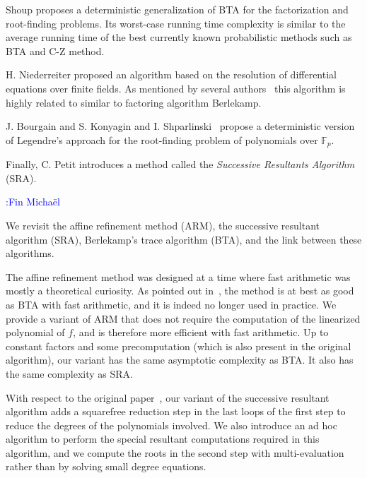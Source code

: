 \documentclass{sig-alternate}
\newcounter{algo}
\newcommand{\comf}{\noindent \textcolor{blue}{:Fin Micha\"el}}
\renewcommand{\paragraph}[1]{\smallskip\noindent{{\bf \rm #1.}}}
\begin{document}
Shoup\cite{Shoup91b} proposes a deterministic generalization of BTA for the factorization and root-finding problems. Its worst-case running time complexity is similar to the average running time of the best currently known probabilistic methods such as BTA and C-Z method.

H. Niederreiter\cite{nied94} proposed an algorithm based on the resolution of differential equations over finite fields.  As mentioned by several authors~\cite{Fleis96} this algorithm is highly related to similar to factoring algorithm Berlekamp.

J. Bourgain  and S. Konyagin and I. Shparlinski~\cite{BKS13} propose a deterministic version of Legendre's approach for the root-finding problem of polynomials over $\mathbb{F}_p$. 

Finally, C. Petit\cite{cgUCL-P14} introduces a method called the \emph{Successive Resultants Algorithm} (SRA). 

\comf




\paragraph{Our contribution}

We revisit the affine refinement method (ARM), the successive resultant algorithm (SRA), Berlekamp's trace algorithm (BTA), and the link between these algorithms.

The affine refinement method was designed at a time where fast arithmetic was mostly a theoretical curiosity. As pointed out in~\cite{cgUCL-P14}, the method is at best as good as BTA with fast arithmetic, and it is indeed no longer used in practice. We provide a variant of ARM that does not require the computation of the linearized polynomial of $f$, and is therefore more efficient with fast arithmetic. Up to constant factors and some precomputation (which is also present in the original algorithm), our variant has the same asymptotic complexity as BTA. It also has the same complexity as SRA.

With respect to the original paper~\cite{cgUCL-P14}, our variant of the successive resultant algorithm adds a squarefree reduction step in the last loops of the first step to reduce the degrees of the polynomials involved. We also introduce an ad hoc algorithm to perform the special resultant computations required in this algorithm, and we compute the roots in the second step with multi-evaluation rather than by solving small degree equations.
\end{document}

